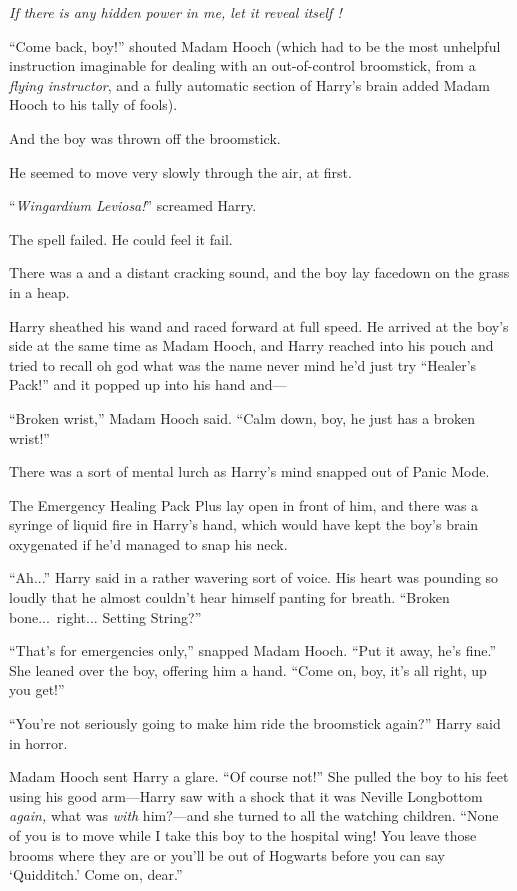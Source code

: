 \emph{If there is any hidden power in me, let it reveal itself !}

“Come back, boy!” shouted Madam Hooch (which had to be the most unhelpful instruction imaginable for dealing with an out-of-control broomstick, from a \emph{flying instructor}, and a fully automatic section of Harry’s brain added Madam Hooch to his tally of fools).

And the boy was thrown off the broomstick.

He seemed to move very slowly through the air, at first.

“\emph{Wingardium Leviosa!}” screamed Harry.

The spell failed. He could feel it fail.

There was a  and a distant cracking sound, and the boy lay facedown on the grass in a heap.

Harry sheathed his wand and raced forward at full speed. He arrived at the boy’s side at the same time as Madam Hooch, and Harry reached into his pouch and tried to recall oh god what was the name never mind he’d just try “Healer’s Pack!” and it popped up into his hand and—

“Broken wrist,” Madam Hooch said. “Calm down, boy, he just has a broken wrist!”

There was a sort of mental lurch as Harry’s mind snapped out of Panic Mode.

The Emergency Healing Pack Plus lay open in front of him, and there was a syringe of liquid fire in Harry’s hand, which would have kept the boy’s brain oxygenated if he’d managed to snap his neck.

“Ah...” Harry said in a rather wavering sort of voice. His heart was pounding so loudly that he almost couldn’t hear himself panting for breath. “Broken bone...\ right... Setting String?”

“That’s for emergencies only,” snapped Madam Hooch. “Put it away, he’s fine.” She leaned over the boy, offering him a hand. “Come on, boy, it’s all right, up you get!”

“You’re not seriously going to make him ride the broomstick again?” Harry said in horror.

Madam Hooch sent Harry a glare. “Of course not!” She pulled the boy to his feet using his good arm—Harry saw with a shock that it was Neville Longbottom \emph{again,} what was \emph{with} him?—and she turned to all the watching children. “None of you is to move while I take this boy to the hospital wing! You leave those brooms where they are or you’ll be out of Hogwarts before you can say ‘Quidditch.’ Come on, dear.”

